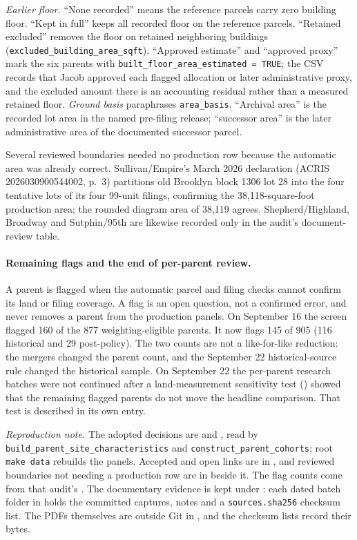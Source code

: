 \noindent \textit{Earlier floor.} ``None recorded'' means the reference
parcels carry zero building floor. ``Kept in full'' keeps all recorded floor on
the reference parcels. ``Retained excluded'' removes the floor on retained
neighboring buildings (\texttt{excluded\_building\_area\_sqft}). ``Approved
estimate'' and ``approved proxy'' mark the six parents with
\texttt{built\_floor\_area\_estimated = TRUE}; the CSV records that Jacob
approved each flagged allocation or later administrative proxy, and the
excluded amount there is an accounting residual rather than a measured
retained floor. \textit{Ground basis} paraphrases \texttt{area\_basis}.
``Archival area'' is the recorded lot area in the named pre-filing release;
``successor area'' is the later administrative area of the documented
successor parcel.

Several reviewed boundaries needed no production row because the automatic
area was already correct. Sullivan/Empire's March 2026 declaration (ACRIS
2026030900544002, p.~3) partitions old Brooklyn block 1306 lot 28 into the four
tentative lots of its four 99-unit filings, confirming the 38,118-square-foot
production area; the rounded diagram area of 38,119 agrees. Shepherd/Highland,
Broadway and Sutphin/95th are likewise recorded only in the audit's
document-review table.

\paragraph{Remaining flags and the end of per-parent review.}
A parent is flagged when the automatic parcel and filing checks cannot confirm
its land or filing coverage. A flag is an open question, not a confirmed
error, and never removes a parent from the production panels. On September 16
the screen flagged 160 of the 877 weighting-eligible parents. It now flags
145 of 905 (116 historical and 29 post-policy). The two
counts are not a like-for-like reduction: the mergers changed the parent count,
and the September 22 historical-source rule changed the historical sample. On
September 22 the per-parent research batches were not continued after a
land-measurement sensitivity test
() showed that the
remaining flagged parents do not move the headline comparison. That test is
described in its own entry.

\textit{Reproduction note.} The adopted decisions are
 and
, read by \texttt{build\_parent\_site\_characteristics}
and \texttt{construct\_parent\_cohorts}; root \texttt{make data} rebuilds the
panels. Accepted and open links are in
,
and reviewed boundaries not needing a production row are in
 beside it. The flag counts come from
that audit's . The documentary
evidence is kept under : each dated
batch folder in  holds the committed captures, notes and a
\texttt{sources.sha256} checksum list. The PDFs themselves are outside Git in
, and the checksum lists record their
bytes.
